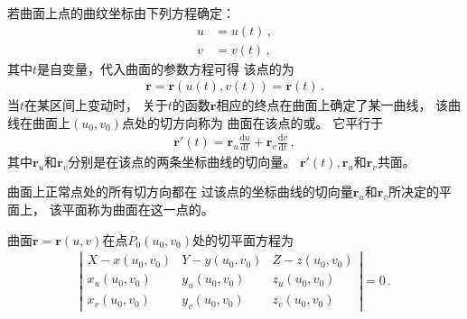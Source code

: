 若曲面上点的曲纹坐标由下列方程确定：
\begin{align}\label{eq:03ex01.13}
    u & =u(t)\, , \\
    v & =v(t)\, ,
\end{align}
其中$t$是自变量，代入曲面的参数方程可得
该点的为
\begin{align}\label{eq:03ex01.14}
    \bm r=\bm r\left(u(t),v(t)\right)=\bm r(t)\, .
\end{align}
当$t$在某区间上变动时，
关于$t$的函数$\bm r$相应的终点在曲面上确定了某一曲线，
该曲线在曲面上$(u_0,v_0)$点处的切方向称为
曲面在该点的或。
它平行于
\begin{align}\label{eq:03ex01.15}
    \bm r'(t)=\bm r_u\frac{\mathrm{d}u}{\mathrm{d}t}+\bm r_v\frac{\mathrm{d}v}{\mathrm{d}t}\, ,
\end{align}
其中$\bm r_u$和$\bm r_v$分别是在该点的两条坐标曲线的切向量。
$\bm r'(t),\bm r_u$和$\bm r_v$共面。
\begin{definition}
    曲面上正常点处的所有切方向都在
    过该点的坐标曲线的切向量$\bm r_u$和$\bm r_v$所决定的平面上，
    该平面称为曲面在这一点的。
\end{definition}
\begin{corollary}
    曲面$\bm r=\bm r(u,v)$在点$P_0(u_0,v_0)$处的切平面方程为
    \begin{align}\label{eq:03ex01.16}
        \left|
        \begin{array}{ccc}
            X-x(u_0,v_0) & Y-y(u_0,v_0) & Z-z(u_0,v_0) \\
            x_u(u_0,v_0) & y_u(u_0,v_0) & z_u(u_0,v_0) \\
            x_v(u_0,v_0) & y_v(u_0,v_0) & z_v(u_0,v_0)
        \end{array}\right|=0\, .
    \end{align}
\end{corollary}

